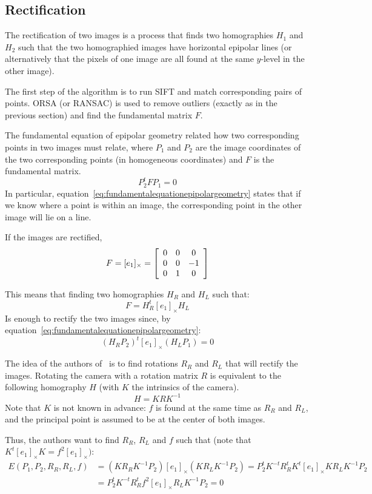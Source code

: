 \subsection{Rectification}\label{subsec:rectification}

The rectification of two images is a process that finds two homographies $H_1$ and $H_2$ such that the two
homographied images have horizontal epipolar lines (or alternatively that the pixels of one image are all found at the
same $y$-level in the other image).

The first step of the algorithm is to run SIFT and match corresponding pairs of points.
ORSA (or RANSAC) is used to remove outliers (exactly as in the previous section) and find the fundamental matrix $F$.

The fundamental equation of epipolar geometry related how two corresponding points in two images must relate,
where $P_1$ and $P_2$ are the image coordinates of the two corresponding points (in homogeneous coordinates) and
$F$ is the fundamental matrix.
\begin{equation}\label{eq:fundamentalequationepipolargeometry}
    P_2^t F P_1=0
\end{equation}
In particular, equation~\eqref{eq:fundamentalequationepipolargeometry} states that if we know where a point is within
an image, the corresponding point in the other image will lie on a line.

If the images are rectified,
\[F=[e_1]_{\times}=\left[
\begin{array}{c c c}
    0 & 0 & 0\\
    0 & 0 & -1\\
    0 & 1 & 0
\end{array}\right]\]

This means that finding two homographies $H_R$ and $H_L$ such that:
\[F= H_R^t [e_1]_{\times} H_L\]
Is enough to rectify the two images since, by equation~\eqref{eq:fundamentalequationepipolargeometry}:
\[(H_R P_2)^t [e_1]_{\times} (H_L P_1) =0\]

The idea of the authors of~\citep{rectification} is to find rotations $R_R$ and $R_L$ that will rectify the images.
Rotating the camera with a rotation matrix $R$ is equivalent to the following homography $H$ (with $K$ the intrinsics
of the camera).
\[H=K R K^{-1}\]
Note that $K$ is not known in advance: $f$ is found at the same time as $R_R$ and $R_L$, and the principal point is
assumed to be at the center of both images.

Thus, the authors want to find $R_R$, $R_L$ and $f$ such that (note that $K^t [e_1]_{\times} K=f^2[e_1]_{\times})$:
\begin{align*}
    E(P_1,P_2,R_R,R_L,f)&=(K R_R K^{-1} P_2)[e_1]_{\times} (K R_L K^{-1} P_2)=P_2^t K^{-t} R_R^t K^t [e_1]_{\times} K R_L K^{-1} P_2\\
    &=P_2^t K^{-t} R_R^t f^2[e_1]_{\times} R_L K^{-1} P_2=0
\end{align*}

